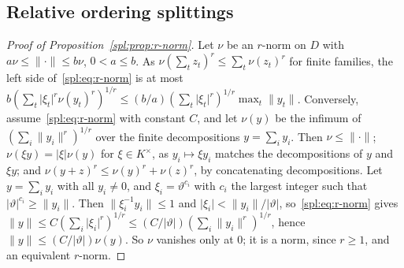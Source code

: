 \documentclass[11pt]{amsart}
\theoremstyle{definition}
\theoremstyle{remark}
\numberwithin{equation}{section}
\newcommand{\abs}[1]{\lvert #1\rvert}
\newcommand{\norm}[1]{\lVert #1\rVert}
\theoremstyle{plain}
\theoremstyle{definition}
\theoremstyle{plain}
\begin{document}
\subsection{Relative ordering splittings}\label{ord:ssec:relative}

\begin{proof}[Proof of Proposition~\ref{spl:prop:r-norm}]
Let $\nu$ be an $r$\nobreakdash-norm on $D$ with $a\nu\le\norm\cdot\le b\nu$, $0<a\le b$. As
$\nu(\sum_tz_t)^r\le\sum_t\nu(z_t)^r$ for finite families, the left side of~\eqref{spl:eq:r-norm} is at most
$b(\sum_t\abs{\xi_t}^r\nu(y_t)^r)^{1/r}\le(b/a)(\sum_t\abs{\xi_t}^r)^{1/r}\max_t\norm{y_t}$. Conversely,
assume~\eqref{spl:eq:r-norm} with constant $C$, and let $\nu(y)$ be the infimum of $(\sum_i\norm{y_i}^r)^{1/r}$ over
the finite decompositions $y=\sum_iy_i$. Then $\nu\le\norm\cdot$;
$\nu(\xi y)=\abs\xi\nu(y)$ for $\xi\in K^\times$, as $y_i\mapsto\xi y_i$ matches the decompositions of $y$ and $\xi y$;
and $\nu(y+z)^r\le\nu(y)^r+\nu(z)^r$, by concatenating decompositions. Let $y=\sum_iy_i$ with all $y_i\ne0$, and
$\xi_i=\vartheta^{c_i}$ with $c_i$ the largest integer such that $\abs\vartheta^{c_i}\ge\norm{y_i}$. Then
$\norm{\xi_i^{-1}y_i}\le1$ and $\abs{\xi_i}<\norm{y_i}/\abs\vartheta$, so~\eqref{spl:eq:r-norm} gives
$\norm y\le C(\sum_i\abs{\xi_i}^r)^{1/r}\le(C/\abs\vartheta)(\sum_i\norm{y_i}^r)^{1/r}$, hence
$\norm y\le(C/\abs\vartheta)\nu(y)$. So $\nu$ vanishes only at $0$; it is a norm, since $r\ge1$, and an equivalent
$r$\nobreakdash-norm.
\end{proof}
\end{document}
